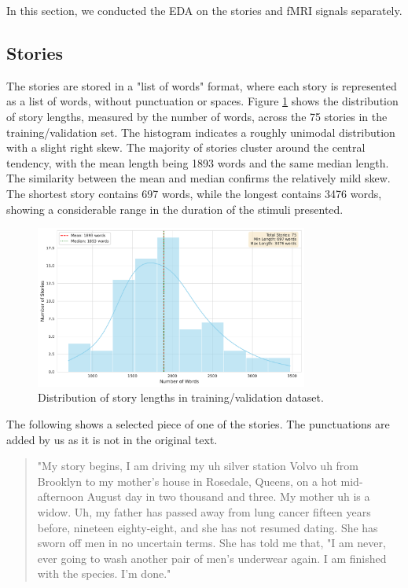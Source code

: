 \documentclass[10pt,letterpaper]{article}
\begin{document}
In this section, we conducted the EDA on the stories and fMRI signals separately.

\subsection{Stories}
The stories are stored in a "list of words" format, where each story is represented as a list of words, without punctuation or spaces. Figure \ref{fig:story_length} shows the distribution of story lengths, measured by the number of words, across the 75 stories in the training/validation set. The histogram indicates a roughly unimodal distribution with a slight right skew. The majority of stories cluster around the central tendency, with the mean length being 1893 words and the same median length. The similarity between the mean and median confirms the relatively mild skew. The shortest story contains 697 words, while the longest contains 3476 words, showing a considerable range in the duration of the stimuli presented.

\begin{figure}[ht]
    \centering
    \includegraphics[width=0.8\textwidth]{figs/story_length_distribution.pdf}
    \caption{Distribution of story lengths in training/validation dataset.}
    \label{fig:story_length}
\end{figure}

The following shows a selected piece of one of the stories. The punctuations are added by us as it is not in the original text.

\begin{quotation}
    "My story begins, I am driving my uh silver station Volvo uh from Brooklyn to my mother's house in Rosedale, Queens, on a hot mid-afternoon August day in two thousand and three. My mother uh is a widow. Uh, my father has passed away from lung cancer fifteen years before, nineteen eighty-eight, and she has not resumed dating. She has sworn off men in no uncertain terms. She has told me that, "I am never, ever going to wash another pair of men's underwear again. I am finished with the species. I'm done."
\end{quotation}
\end{document}
